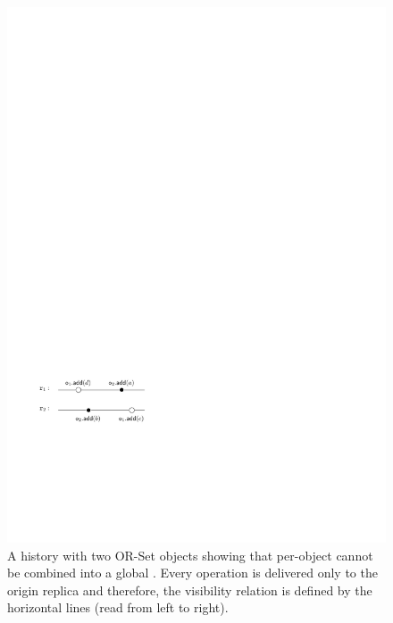 \begin{figure}
  \centering
  \includegraphics[width=0.35 \textwidth]{figures/TwoSubLin-NotaGlobalLin.pdf}
  \caption{A history with two OR-Set objects showing that per-object  cannot be combined into a global \crdtlinearization{}. Every operation is delivered only to the origin replica and therefore, the visibility relation is defined by the horizontal lines (read from left to right).}
  \label{fig:negative_composition}
\end{figure}

